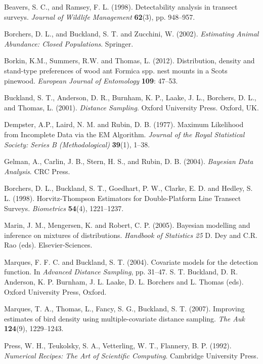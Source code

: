 \documentclass[useAMS,referee]{biom}
\begin{document}
\begin{thebibliography}{}

\bibitem{ } Beavers, S. C., and Ramsey, F. L. (1998). Detectability analysis in transect surveys. \textit{Journal of Wildlife Management} \textbf{62}(3), pp. 948--957.

\bibitem{} Borchers, D. L., and Buckland, S. T. and Zucchini, W. (2002). \textit{Estimating Animal Abundance: Closed Populations}. Springer.

\bibitem{ } Borkin, K.M., Summers, R.W. and Thomas, L. (2012). Distribution, density and stand-type preferences of wood ant Formica spp. nest mounts in a Scots pinewood. \textit{European Journal of Entomology} \textbf{109}: 47--53.

\bibitem{ }  Buckland, S. T., Anderson, D. R., Burnham, K. P., Laake, J. L., Borchers, D. L., and Thomas, L.  (2001). \textit{Distance Sampling}. Oxford University Press. Oxford, UK.

\bibitem{ } Dempster, A.P., Laird,  N. M. and Rubin, D. B. (1977). Maximum Likelihood from Incomplete Data via the EM Algorithm. \textit{Journal of the Royal Statistical Society: Series B (Methodological)} \textbf{39}(1), 1--38.

\bibitem{ }  Gelman, A., Carlin, J. B., Stern, H. S., and Rubin, D. B. (2004). \textit{Bayesian Data Analysis}. CRC Press.


\bibitem{} Borchers, D. L., Buckland, S. T., Goedhart, P. W., Clarke, E. D. and Hedley, S. L. (1998). Horvitz-Thompson Estimators for Double-Platform Line Transect Surveys. \textit{Biometrics} \textbf{54}(4), 1221--1237.

\bibitem{ } Marin, J. M., Mengersen, K. and Robert, C. P. (2005). Bayesian modelling and inference on mixtures of distributions. \textit{Handbook of Statistics 25} D. Dey and C.R. Rao (eds). Elsevier-Sciences.

\bibitem{ } Marques, F. F. C. and Buckland, S. T. (2004). Covariate models for the detection function. In \textit{Advanced Distance Sampling}, pp. 31--47. S. T. Buckland, D. R. Anderson, K. P. Burnham, J. L. Laake, D. L. Borchers and L. Thomas (eds). Oxford University Press, Oxford.

\bibitem{ } Marques, T. A., Thomas, L., Fancy, S. G., Buckland, S. T. (2007). Improving estimates of bird density using multiple-covariate distance sampling. \textit{The Auk} \textbf{124}(9), 1229--1243.

\bibitem{ } Press, W. H., Teukolsky, S. A., Vetterling, W. T., Flannery, B. P. (1992). \textit{Numerical Recipes: The Art of Scientific Computing}. Cambridge University Press. 

\end{thebibliography}

\label{lastpage}
\end{document}
